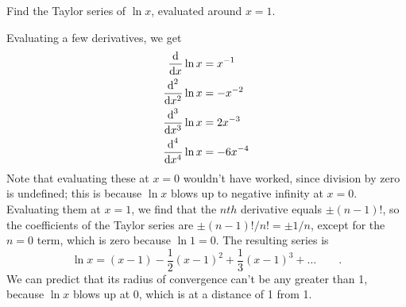\begin{eg}
\egquestion
Find the Taylor series of $\ln x$, evaluated around $x=1$.

\eganswer
Evaluating a few derivatives, we get
\begin{align*}
  \frac{\textup{d}}{\textup{d} x}\ln x &= x^{-1} \\
  \frac{\textup{d}^2}{\textup{d} x^2}\ln x &= -x^{-2}\\
  \frac{\textup{d}^3}{\textup{d} x^3}\ln x &= 2x^{-3}\\
  \frac{\textup{d}^4}{\textup{d} x^4}\ln x &= -6x^{-4}
\end{align*}
Note that evaluating these at $x=0$ wouldn't have worked, since division by zero is undefined;
this is because $\ln x$ blows up to negative infinity at $x=0$. Evaluating them at $x=1$, we
find that the $nth$ derivative equals $\pm (n-1)!$, so the coefficients of the Taylor
series are $\pm (n-1)!/n!=\pm1/n$, except for the $n=0$ term, which is zero because
$\ln 1=0$. The resulting series is
\begin{equation*}
  \ln x = (x-1) - \frac{1}{2}(x-1)^2 + \frac{1}{3}(x-1)^3 + \ldots \qquad .
\end{equation*}
We can predict that its radius of convergence can't be any greater than 1, because
$\ln x$ blows up at 0, which is at a distance of 1 from 1.
\end{eg}

